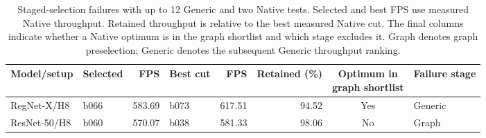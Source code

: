 \begin{table}[t]
\centering\small
\caption{Staged-selection failures with up to 12 Generic and two Native tests. Selected and best FPS use measured Native throughput. Retained throughput is relative to the best measured Native cut. The final columns indicate whether a Native optimum is in the graph shortlist and which stage excludes it. Graph denotes graph preselection; Generic denotes the subsequent Generic throughput ranking.}
\label{tab:staged-failures-12}
\setlength{\tabcolsep}{3pt}
\begin{tabular*}{\textwidth}{@{\extracolsep{\fill}}llrlrrcl@{}}
\toprule
Model/setup & Selected & FPS & Best cut & FPS & Retained (\%) & \shortstack{Optimum in\\graph shortlist} & Failure stage \\
\midrule
RegNet-X/H8 & b066 & 583.69 & b073 & 617.51 & 94.52 & Yes & Generic\\
ResNet-50/H8 & b060 & 570.07 & b038 & 581.33 & 98.06 & No & Graph\\
\bottomrule
\end{tabular*}
\end{table}
